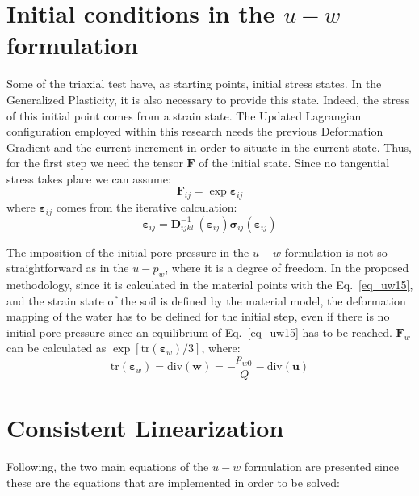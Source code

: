\documentclass[preprint,12pt,a4paper]{elsarticle}
\begin{document}
\section{Initial conditions in the $u-w$ formulation}
\label{ap:1}
Some of the triaxial test have, as starting points, initial stress states. In the Generalized Plasticity, it is also necessary to provide this state. Indeed, the stress of this initial point comes from a strain state. The Updated Lagrangian configuration employed within this research needs the previous Deformation Gradient and the current increment in order to situate in the current state. Thus, for the first step we need the tensor $\boldsymbol{F}$ of the initial state. Since no tangential stress takes place we can assume:
\begin{equation}
    \boldsymbol{F}_{ij}=\exp{\boldsymbol{\varepsilon}_{ij}}
\end{equation}
where $\boldsymbol{\varepsilon}_{ij}$ comes from the iterative calculation:
\begin{equation}
    \boldsymbol{\varepsilon}_{ij}=\boldsymbol{D}^{-1}_{ijkl}\:(\boldsymbol{\varepsilon}_{ij})\boldsymbol{\sigma}_{ij}(\boldsymbol{\varepsilon}_{ij})
\end{equation}

The imposition of the initial pore pressure in the $u-w$ formulation is not so straightforward as in the $u-p_w$, where it is a degree of freedom. In the proposed methodology, since it is calculated in the material points with the Eq.~\eqref{eq_uw15}, and the strain state of the soil is defined by the material model, the deformation mapping of the water has to be defined for the initial step, even if there is no initial pore pressure since an equilibrium of Eq.~\eqref{eq_uw15} has to be reached. $\boldsymbol{F}_w$ can be calculated as $\exp{\left[\text{tr}\left(\boldsymbol{\varepsilon}_{w}\right)/3\right]}$, where:
\begin{equation}
  \text{tr}\left(\boldsymbol{\varepsilon}_{w}\right) = \mbox{div} (\boldsymbol{w}) = -\frac{p_{w0}}{Q} - \mbox{div} (\boldsymbol{u})
\end{equation}


\section{Consistent Linearization}
\label{ap:2}
Following, the two main equations of the $u-w$ formulation are presented since these are the equations that are implemented in order to be solved:
\end{document}
